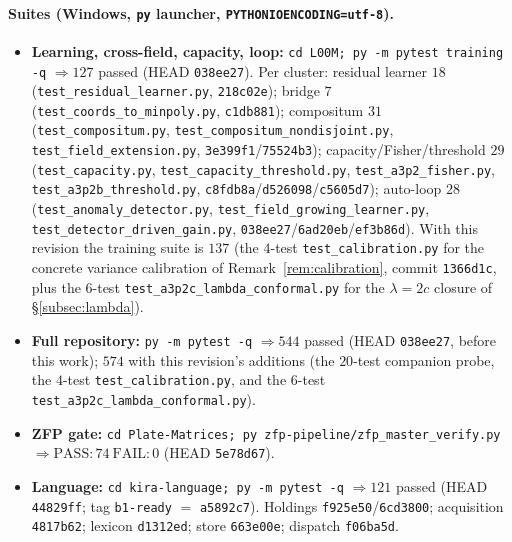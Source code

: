 \documentclass[11pt]{article}
\theoremstyle{plain}
\theoremstyle{definition}
\theoremstyle{remark}
\begin{document}
\paragraph{Suites (Windows, \texttt{py} launcher, \texttt{PYTHONIOENCODING=utf-8}).}
\begin{itemize}[leftmargin=*]
  \item \textbf{Learning, cross-field, capacity, loop:} \texttt{cd L00M; py -m pytest training -q}
        $\Rightarrow 127$ passed (HEAD \texttt{038ee27}). Per cluster: residual learner $18$
        (\texttt{test\_residual\_learner.py}, \texttt{218c02e}); bridge $7$
        (\texttt{test\_coords\_to\_minpoly.py}, \texttt{c1db881}); compositum $31$
        (\texttt{test\_compositum.py}, \texttt{test\_compositum\_nondisjoint.py},
        \texttt{test\_field\_extension.py}, \texttt{3e399f1}/\texttt{75524b3}); capacity/Fisher/threshold $29$
        (\texttt{test\_capacity.py}, \texttt{test\_capacity\_threshold.py}, \texttt{test\_a3p2\_fisher.py},
        \texttt{test\_a3p2b\_threshold.py}, \texttt{c8fdb8a}/\texttt{d526098}/\texttt{c5605d7}); auto-loop $28$
        (\texttt{test\_anomaly\_detector.py}, \texttt{test\_field\_growing\_learner.py},
        \texttt{test\_detector\_driven\_gain.py}, \texttt{038ee27}/\texttt{6ad20eb}/\texttt{ef3b86d}). With this
        revision the training suite is $137$ (the $4$-test \texttt{test\_calibration.py} for the concrete
        variance calibration of Remark~\ref{rem:calibration}, commit \texttt{1366d1c}, plus the $6$-test
        \texttt{test\_a3p2c\_lambda\_conformal.py} for the $\lambda=2c$ closure of \S\ref{subsec:lambda}).
  \item \textbf{Full repository:} \texttt{py -m pytest -q} $\Rightarrow 544$ passed (HEAD \texttt{038ee27},
        before this work); $574$ with this revision's additions (the $20$-test companion probe, the
        $4$-test \texttt{test\_calibration.py}, and the $6$-test \texttt{test\_a3p2c\_lambda\_conformal.py}).
  \item \textbf{ZFP gate:} \texttt{cd Plate-Matrices; py zfp-pipeline/zfp\_master\_verify.py} $\Rightarrow
        \mathrm{PASS}{:}74\ \mathrm{FAIL}{:}0$ (HEAD \texttt{5e78d67}).
  \item \textbf{Language:} \texttt{cd kira-language; py -m pytest -q} $\Rightarrow 121$ passed (HEAD
        \texttt{44829ff}; tag \texttt{b1-ready} $=$ \texttt{a5892c7}). Holdings \texttt{f925e50}/\texttt{6cd3800};
        acquisition \texttt{4817b62}; lexicon \texttt{d1312ed}; store \texttt{663e00e}; dispatch
        \texttt{f06ba5d}.
\end{itemize}
\end{document}
